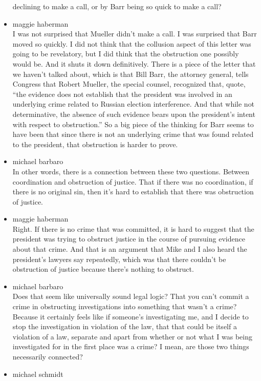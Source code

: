\begin{itemize}
  declining to make a call, or by Barr being so quick to make a call?
\item
  maggie haberman\\
  I was not surprised that Mueller didn't make a call. I was surprised
  that Barr moved so quickly. I did not think that the collusion aspect
  of this letter was going to be revelatory, but I did think that the
  obstruction one possibly would be. And it shuts it down definitively.
  There is a piece of the letter that we haven't talked about, which is
  that Bill Barr, the attorney general, tells Congress that Robert
  Mueller, the special counsel, recognized that, quote, ``the evidence
  does not establish that the president was involved in an underlying
  crime related to Russian election interference. And that while not
  determinative, the absence of such evidence bears upon the president's
  intent with respect to obstruction.'' So a big piece of the thinking
  for Barr seems to have been that since there is not an underlying
  crime that was found related to the president, that obstruction is
  harder to prove.
\item
  michael barbaro\\
  In other words, there is a connection between these two questions.
  Between coordination and obstruction of justice. That if there was no
  coordination, if there is no original sin, then it's hard to establish
  that there was obstruction of justice.
\item
  maggie haberman\\
  Right. If there is no crime that was committed, it is hard to suggest
  that the president was trying to obstruct justice in the course of
  pursuing evidence about that crime. And that is an argument that Mike
  and I also heard the president's lawyers say repeatedly, which was
  that there couldn't be obstruction of justice because there's nothing
  to obstruct.
\item
  michael barbaro\\
  Does that seem like universally sound legal logic? That you can't
  commit a crime in obstructing investigations into something that
  wasn't a crime? Because it certainly feels like if someone's
  investigating me, and I decide to stop the investigation in violation
  of the law, that that could be itself a violation of a law, separate
  and apart from whether or not what I was being investigated for in the
  first place was a crime? I mean, are those two things necessarily
  connected?
\item
  michael schmidt\\

\end{itemize}
